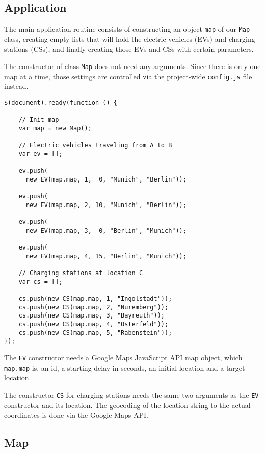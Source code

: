 \newpage
\subsection{Application}

The main application routine consists of constructing an object \texttt{map} of our \texttt{Map} class, creating empty lists that will hold the electric vehicles (EVs) and charging stations (CSs), and finally creating those EVs and CSs with certain parameters.

The constructor of class \texttt{Map} does not need any arguments. Since there is only one map at a time, those settings are controlled via the project-wide \texttt{config.js} file instead.

\begin{verbatim}
$(document).ready(function () {

    // Init map
    var map = new Map();

    // Electric vehicles traveling from A to B
    var ev = [];

    ev.push(
      new EV(map.map, 1,  0, "Munich", "Berlin"));

    ev.push(
      new EV(map.map, 2, 10, "Munich", "Berlin"));

    ev.push(
      new EV(map.map, 3,  0, "Berlin", "Munich"));

    ev.push(
      new EV(map.map, 4, 15, "Berlin", "Munich"));

    // Charging stations at location C
    var cs = [];

    cs.push(new CS(map.map, 1, "Ingolstadt"));
    cs.push(new CS(map.map, 2, "Nuremberg"));
    cs.push(new CS(map.map, 3, "Bayreuth"));
    cs.push(new CS(map.map, 4, "Osterfeld"));
    cs.push(new CS(map.map, 5, "Rabenstein"));
});
\end{verbatim}

The \texttt{EV} constructor needs a Google Maps JavaScript API map object, which \texttt{map.map} is, an id, a starting delay in seconds, an initial location and a target location.

The constructor \texttt{CS} for charging stations needs the same two arguments as the \texttt{EV} constructor and its location. The geocoding of the location string to the actual coordinates is done via the Google Maps API.


\subsection{Map}

